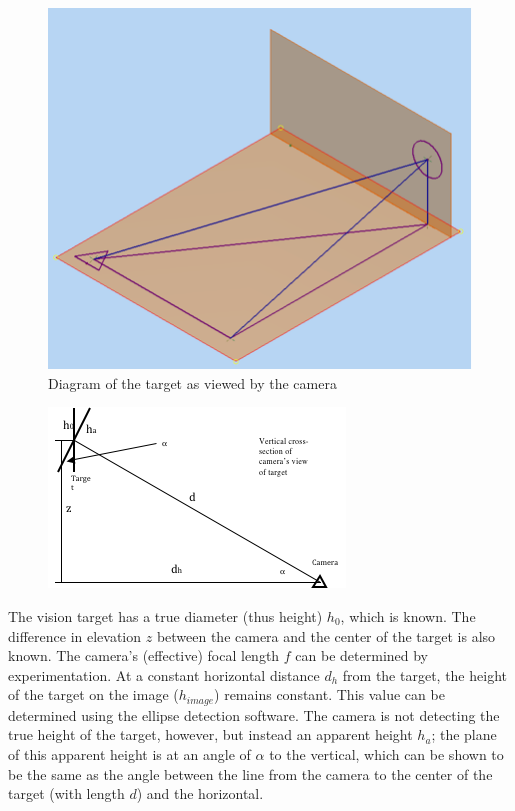 \documentclass{article}
\begin{document}
\begin{figure}[!htbp]

		\centering

		\includegraphics{3d_target_model.png}

		\caption{Diagram of the target as viewed by the camera}

\end{figure}

\begin{figure}[!htbp]

		\centering

		\includegraphics{yz_target_model.png}

\end{figure}

The vision target has a true diameter (thus height) $h_{0}$, which is known. The difference in elevation $z$ between the camera and the center of the target is also known. The camera’s (effective) focal length $f$ can be determined by experimentation. At a constant horizontal distance $d_{h}$ from the target, the height of the target on the image ($h_{image}$) remains constant. This value can be determined using the ellipse detection software. The camera is not detecting the true height of the target, however, but instead an apparent height $h_{a}$; the plane of this apparent height is at an angle of $\alpha$ to the vertical, which can be shown to be the same as the angle between the line from the camera to the center of the target (with length $d$) and the horizontal.
\end{document}
